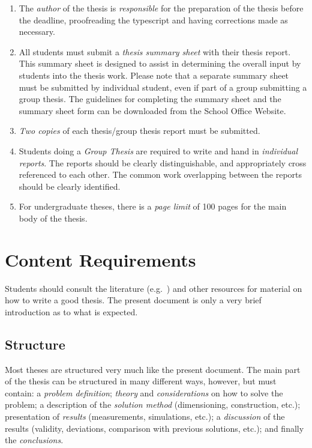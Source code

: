 \begin{enumerate}
\item The \emph{author} of the thesis is \emph{responsible} for the preparation of the
thesis before the deadline, proofreading the
typescript and having corrections made as necessary.
\item All students must submit a \emph{thesis summary sheet} with their thesis
report. This summary sheet is designed to assist
in determining the overall input by students into the thesis work. Please
note that a separate summary sheet must
be submitted by individual student, even if part of a group submitting a
group thesis.
The guidelines for completing
the summary sheet and the summary sheet form can be downloaded from the
School Office Website.
\item \emph{Two copies} of each thesis/group thesis report must be submitted.
\item Students doing a \emph{Group Thesis} are required to write and hand in
\emph{individual reports}.  The reports should be
clearly distinguishable, and appropriately cross referenced to each other.
The common work overlapping between the reports should be clearly
identified.
\item For undergraduate theses, there is a \emph{page limit} of 100 pages for the main body of the thesis.
\end{enumerate}



\chapter{Content Requirements}\label{ch:content}

Students should consult the literature (e.g.~\cite{Sid99,StrWhi79,Coo64,GRS14})
and other resources for material on how to write a good
thesis.  The present document is only a very brief introduction as to what
is expected.

\nocite{NieLeh03,HasLehKwo05}

\section{Structure}
Most theses are structured very much like the present document.
The main part of the thesis can be structured in many different ways,
however, but must contain: a \emph{problem definition};
\emph{theory} and \emph{considerations} on how to solve the problem;
a description of the \emph{solution method} (dimensioning, construction,
etc.);
presentation of \emph{results} (measurements, simulations, etc.);
a \emph{discussion} of the results (validity, deviations, comparison
with previous solutions, etc.); and finally the \emph{conclusions}.

